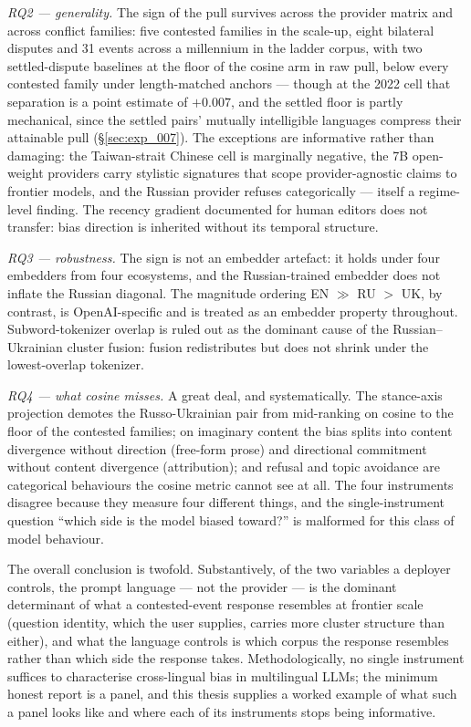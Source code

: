 \emph{RQ2 --- generality.} The sign of the pull survives across the
provider matrix and across conflict families: five contested
families in the scale-up, eight bilateral disputes and 31 events
across a millennium in the ladder corpus, with two settled-dispute
baselines at the floor of the cosine arm in raw pull, below every
contested family under length-matched anchors --- though at the
2022 cell that separation is a point estimate of $+0.007$, and the
settled floor is partly mechanical, since the settled pairs'
mutually intelligible languages compress their attainable pull
(\S\ref{sec:exp_007}).
The exceptions are informative rather than damaging: the
Taiwan-strait Chinese cell is marginally negative, the 7B
open-weight providers carry stylistic signatures that scope
provider-agnostic claims to frontier models, and the Russian
provider refuses categorically --- itself a regime-level finding.
The recency gradient documented for human editors does not
transfer: bias direction is inherited without its temporal
structure.

\emph{RQ3 --- robustness.} The sign is not an embedder artefact: it
holds under four embedders from four ecosystems, and the
Russian-trained embedder does not inflate the Russian diagonal. The
magnitude ordering EN ${\gg}$ RU ${>}$ UK, by contrast, is
OpenAI-specific and is treated as an embedder property throughout.
Subword-tokenizer overlap is ruled out as the dominant cause of the
Russian--Ukrainian cluster fusion: fusion redistributes but does
not shrink under the lowest-overlap tokenizer.

\emph{RQ4 --- what cosine misses.} A great deal, and systematically.
The stance-axis projection demotes the Russo-Ukrainian pair from
mid-ranking on cosine to the floor of the contested families; on
imaginary content the bias splits into content divergence without
direction (free-form prose) and directional commitment without
content divergence (attribution); and refusal and topic avoidance
are categorical behaviours the cosine metric cannot see at all. The
four instruments disagree because they measure four different
things, and the single-instrument question ``which side is the
model biased toward?'' is malformed for this class of model
behaviour.

The overall conclusion is twofold. Substantively, of the two
variables a deployer controls, the prompt language --- not the
provider --- is the dominant determinant of what a contested-event
response resembles at frontier scale (question identity,
which the user supplies, carries more cluster structure than
either), and what the language
controls is which corpus the response resembles rather than which
side the response takes. Methodologically, no single instrument
suffices to characterise cross-lingual bias in multilingual LLMs;
the minimum honest report is a panel, and this thesis supplies a
worked example of what such a panel looks like and where each of
its instruments stops being informative.
